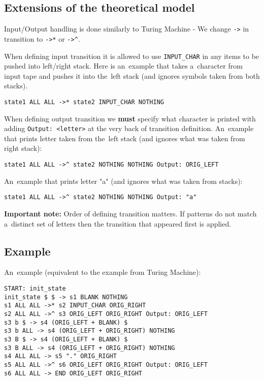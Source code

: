 \documentclass[english,shortabstract,mgr]{iithesis}
\begin{document}
\subsection {Extensions of the theoretical model}

Input/Output handling is done similarly to Turing Machine - We change \texttt{->} in transition
to \texttt{->*} or \texttt{->\^}.

When defining input transition it is allowed to use \texttt{INPUT\_CHAR} in any items
to be pushed into left/right stack. Here is an~example that takes a~character from input
tape and pushes it into the~left stack (and ignores symbols taken from both stacks).
\begin{verbatim}
state1 ALL ALL ->* state2 INPUT_CHAR NOTHING
\end{verbatim}

When defining output transition we \textbf{must} specify what character is printed
with adding \texttt{Output: <letter>} at the very back of transition definition.
An~example that prints letter taken from the~left stack (and ignores what was taken from right stack):
\begin{verbatim}
state1 ALL ALL ->^ state2 NOTHING NOTHING Output: ORIG_LEFT
\end{verbatim}
An~example that prints letter "a" (and ignores what was taken from stacks):
\begin{verbatim}
state1 ALL ALL ->^ state2 NOTHING NOTHING Output: "a"
\end{verbatim}

\textbf{Important note:} Order of defining transition matters. If patterns do not match
a~distinct set of letters then the transition that appeared first is applied.

\subsection{Example}

An~example (equivalent to the example from Turing Machine):
\begin{verbatim}
START: init_state
init_state $ $ -> s1 BLANK NOTHING
s1 ALL ALL ->* s2 INPUT_CHAR ORIG_RIGHT
s2 ALL ALL ->^ s3 ORIG_LEFT ORIG_RIGHT Output: ORIG_LEFT
s3 b $ -> s4 (ORIG_LEFT + BLANK) $
s3 b ALL -> s4 (ORIG_LEFT + ORIG_RIGHT) NOTHING
s3 B $ -> s4 (ORIG_LEFT + BLANK) $
s3 B ALL -> s4 (ORIG_LEFT + ORIG_RIGHT) NOTHING
s4 ALL ALL -> s5 "." ORIG_RIGHT
s5 ALL ALL ->^ s6 ORIG_LEFT ORIG_RIGHT Output: ORIG_LEFT
s6 ALL ALL -> END ORIG_LEFT ORIG_RIGHT
\end{verbatim}
\end{document}
